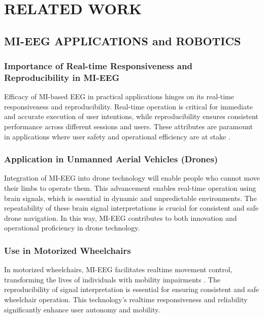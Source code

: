 \section{RELATED WORK}
\label{sec:relatedwork}
    \subsection{MI-EEG APPLICATIONS and ROBOTICS}
    \label{subsec:MI-EEG APPLICATIONS and ROBOTICS}
        \subsubsection*{Importance of Real-time Responsiveness and Reproducibility in MI-EEG}
        Efficacy of MI-based EEG  in practical applications hinges on its real-time responsiveness and reproducibility. Real-time operation is critical for immediate and accurate execution of user intentions, while reproducibility ensures consistent performance across different sessions and users. These attributes are paramount in applications where user safety and operational efficiency are at stake \cite{singh2021comprehensive}.

        \subsubsection*{Application in Unmanned Aerial Vehicles (Drones)}
        \label{subsubsec:Application in Unmanned Aerial Vehicles (Drones)}
        Integration of MI-EEG into drone technology will enable people who cannot move their limbs to operate them. This advancement enables real-time operation using brain signals, which is essential in dynamic and unpredictable environments. The repeatability of these brain signal interpretations is crucial for consistent and safe drone navigation. In this way, MI-EEG contributes to both innovation and operational proficiency in drone technology\cite{dumitrescu2021using}.

        \subsubsection*{Use in Motorized Wheelchairs}
        \label{subsubsec:Use in Motorized Wheelchairs}
        In motorized wheelchairs, MI-EEG facilitates realtime movement control, transforming the lives of individuals with mobility impairments \cite{palumbo2021motor,wang2024mi}. The reproducibility of signal interpretation is essential for ensuring consistent and safe wheelchair operation. This technology's realtime responsiveness and reliability significantly enhance user autonomy and mobility.

